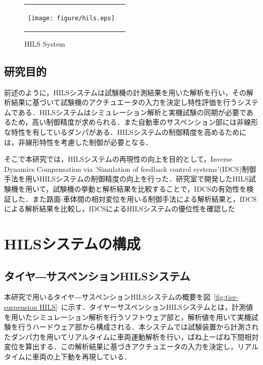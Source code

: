 \documentclass[a4paper,12pt]{article_vdlab_sotsuron}
\begin{document}

\vspace{10mm}
\begin{figure}[h!]
  \begin{tabular}{cc}
    \begin{minipage}{1.0\hsize}
      \begin{center}
	\texttt{[image: figure/hils.eps]}
	\caption{HILS System\cite{toyota_hils}}
	\label{fig:HILS system}
      \end{center}
     \end{minipage}
    \end{tabular}
\end{figure}

\newpage
\subsection{研究目的}
前述のように，HILSシステムは試験機の計測結果を用いた解析を行い，その解析結果に基づいて試験機のアクチュエータの入力を決定し特性評価を行うシステムである．HILSシステムはシミュレーション解析と実機試験の同期が必要であるため，高い制御精度が求められる．また自動車のサスペンション部には非線形な特性を有しているダンパがある．HILSシステムの制御精度を高めるためには，非線形特性を考慮した制御が必要となる．

そこで本研究では，HILSシステムの再現性の向上を目的として，Inverse Dynamics Compensation via 'Simulation of feedback control systems'(IDCS)制御手法を用いHILSシステムの制御精度の向上を行った．研究室で開発したHILS試験機を用いて，試験機の挙動と解析結果を比較することで，IDCSの有効性を検証した．また路面-車体間の相対変位を用いる制御手法による解析結果と，IDCSによる解析結果を比較し，IDCSによるHILSシステムの優位性を確認した

\newpage
\section{HILSシステムの構成}
\subsection{タイヤ―サスペンションHILSシステム}
本研究で用いるタイヤ―サスペンションHILSシステムの概要を図~\ref{fig:tier-suspension HILS}~に示す．タイヤーサスペンションHILSシステムとは，計測値を用いたシミュレーション解析を行うソフトウェア部と，解析値を用いて実機試験を行うハードウェア部から構成される．本システムでは試験装置から計測されたダンパ力を用いてリアルタイムに車両運動解析を行い，ばね上ーばね下間相対変位を算出する．この解析結果に基づきアクチュエータの入力を決定し，リアルタイムに車両の上下動を再現している．
\end{document}
